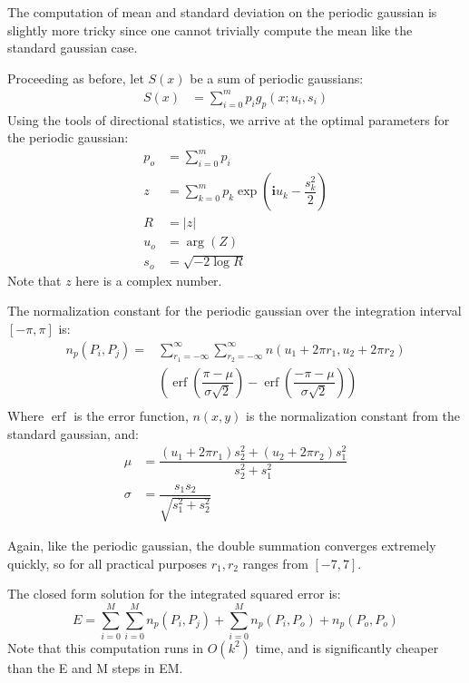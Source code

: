 \documentclass{acm_proc_article-sp}
\DeclareMathOperator\erf{erf}
\begin{document}
The computation of mean and standard deviation on the periodic gaussian is slightly more tricky since one cannot trivially compute the mean like the standard gaussian case. 

Proceeding as before, let $S(x)$ be a sum of periodic gaussians:
 \begin{align}
S(x) &= \sum\limits^{m}_{i=0} p_i g_p(x; u_i, s_i)
\end{align}
Using the tools of directional statistics, we arrive at the optimal parameters for the periodic gaussian:
\begin{align*}
p_o &= \sum \limits^{m}_{i=0} p_i \\
z &= \sum\limits^{m}_{k=0} p_k \exp\left(\boldsymbol{i}u_k-\dfrac{s_k^2}{2}\right) \\
R &= |z| \\
u_o &= \arg(Z) \\
s_o &= \sqrt{-2\log R}
\end{align*}
Note that $z$ here is a complex number.

The normalization constant for the periodic gaussian over the integration interval $[-\pi, \pi]$ is:
\begin{align*}
n_p(P_i,P_j) = & \sum \limits^{\infty}_{r_1=-\infty} \sum \limits^{\infty}_{r_2=-\infty} n(u_1+2 \pi r_1, u_2+2 \pi r_2) \\
                        & \left(\erf\left( \dfrac{\pi-\mu}{\sigma\sqrt{2}}\right) - \erf\left( \dfrac{-\pi-\mu}{\sigma\sqrt{2}}\right)\right) \\
\end{align*}
Where $\erf$ is the error function, $n(x,y)$ is the normalization constant from the standard gaussian, and:
\begin{align*}
\mu &= \dfrac{ (u_1+2 \pi r_1)s_2^2 +  (u_2+2 \pi r_2)s_1^2} {s_2^2 + s_1^2} \\
\sigma &= \dfrac{s_1 s_2}{\sqrt{s_1^2+s_2^2}}
\end{align*}
 
Again, like the periodic gaussian, the double summation converges extremely quickly, so for all practical purposes $r_1, r_2$ ranges from $[-7,7]$.

The closed form solution for the integrated squared error is:
\begin{equation}
E = \sum \limits^{M}_{i=0} \sum \limits^{M}_{i=0} n_p(P_i, P_j) + \sum \limits^{M}_{i=0} n_p(P_i, P_o) + n_p(P_o, P_o)
\end{equation}
Note that this computation runs in $O(k^2)$ time, and is significantly cheaper than the E and M steps in EM. 
\end{document}
